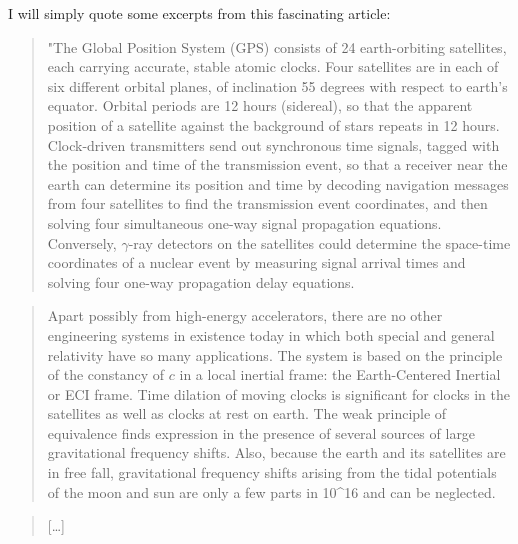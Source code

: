 \documentclass{article}
\begin{document}
I will simply quote some excerpts from this fascinating article:

\begin{quote}
"The Global Position System (GPS) consists of 24 earth-orbiting
satellites, each carrying accurate, stable atomic clocks. Four
satellites are in each of six different orbital planes, of inclination
55 degrees with respect to earth's equator. Orbital periods are 12 hours
(sidereal), so that the apparent position of a satellite against the
background of stars repeats in 12 hours. Clock-driven transmitters send
out synchronous time signals, tagged with the position and time of the
transmission event, so that a receiver near the earth can determine its
position and time by decoding navigation messages from four satellites
to find the transmission event coordinates, and then solving four
simultaneous one-way signal propagation equations. Conversely,
\(\gamma\)-ray detectors on the satellites could determine the
space-time coordinates of a nuclear event by measuring signal arrival
times and solving four one-way propagation delay equations.
\end{quote}

\begin{quote}
Apart possibly from high-energy accelerators, there are no other
engineering systems in existence today in which both special and general
relativity have so many applications. The system is based on the
principle of the constancy of \(c\) in a local inertial frame: the
Earth-Centered Inertial or ECI frame. Time dilation of moving clocks is
significant for clocks in the satellites as well as clocks at rest on
earth. The weak principle of equivalence finds expression in the
presence of several sources of large gravitational frequency shifts.
Also, because the earth and its satellites are in free fall,
gravitational frequency shifts arising from the tidal potentials of the
moon and sun are only a few parts in 10\^{}16 and can be neglected.
\end{quote}

\begin{quote}
{[}\ldots{]}
\end{quote}
\end{document}
